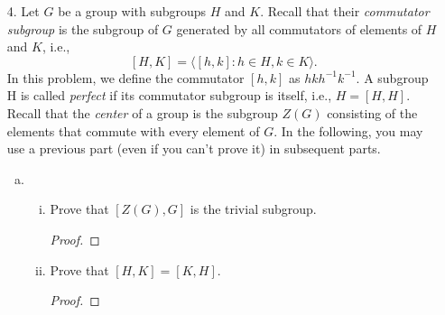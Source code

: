 \begin{itemize}
\begin{enumerate}[(a)]
\begin{proof}
\end{proof}


\item Find all $x \in \bbr^4$ with $\ns{x} = 1$ so that $\ns{Mx}$ is maximized.
\begin{proof}

\end{proof}

\item Describe the eigenvalues and eigenvectors of $M^T M$.
\begin{proof}
        
\end{proof}


\item Find the least square solution for $M x = b$ with $\ns{x}$ minimal where
$b = (1, 1, 1)^T$. (Hint: Use the pseudo-inverse of $M$.)
\begin{proof}

\end{proof}


\end{enumerate}





\item[4.] Let $G$ be a group with subgroups $H$ and $K$. Recall that their \textit{commutator subgroup}
is the subgroup of $G$ generated by all commutators of elements of $H$ and $K$, i.e., 
$$[H,K] = \langle [h,k] : h \in H, k \in K \rangle.$$
In this problem, we define the commutator $[h, k]$ as $hkh^{-1}k^{-1}$. A subgroup H is
called \textit{perfect} if its commutator subgroup is itself, i.e., $H = [H, H]$. Recall that the
\textit{center} of a group is the subgroup $Z(G)$ consisting of the elements that commute
with every element of $G$. In the following, you may use a previous part (even if you
can’t prove it) in subsequent parts.

\begin{enumerate}[(a)]
\item \begin{enumerate}[(i)]
        \item Prove that $[Z(G), G]$ is the trivial subgroup.
        \begin{proof}
        
        \end{proof}
        
        \item Prove that $[H, K] = [K, H]$.
        \begin{proof}


\end{proof}
\end{enumerate}
\end{enumerate}
\end{itemize}
